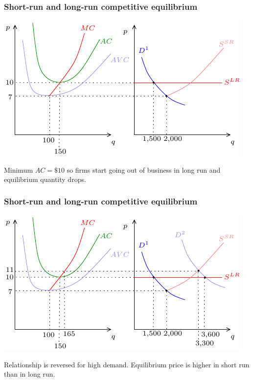 \documentclass[xcolor=pdftex,dvipsnames]{beamer}
\begin{document}
\begin{frame}
\frametitle{Short-run and long-run competitive equilibrium}
\begin{center}
\includegraphics{pics/SRLREqu2} 
\end{center}
Minimum $AC=\$10$ so firms start going out of business in long run and
equilibrium quantity drops. 

\end{frame}


\begin{frame}
\frametitle{Short-run and long-run competitive equilibrium}
\begin{center}
\includegraphics{pics/SRLREqu3}
\end{center}
Relationship is reversed
for high demand. Equilibrium price is higher in short run than in long
run.
\end{frame}
\end{document}
